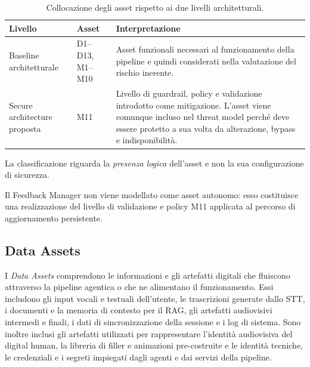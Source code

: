 \documentclass[11pt,a4paper]{article}
\begin{document}
\begin{table}[H]
\centering
\caption{Collocazione degli asset rispetto ai due livelli architetturali.}
\label{tab:asset-baseline-secure}
\small
\begin{tabularx}{\textwidth}{|L{3.4cm}|Y|Y|}
\hline
\textbf{Livello} &
\textbf{Asset} &
\textbf{Interpretazione}
\\
\hline

Baseline architetturale &
D1--D13, M1--M10 &
Asset funzionali necessari al funzionamento della pipeline e quindi
considerati nella valutazione del rischio inerente.
\\
\hline

Secure architecture proposta &
M11 &
Livello di guardrail, policy e validazione introdotto come mitigazione.
L'asset viene comunque incluso nel threat model perché deve essere
protetto a sua volta da alterazione, bypass e indisponibilità.
\\
\hline
\end{tabularx}
\end{table}

La classificazione riguarda la \emph{presenza logica} dell'asset e non
la sua configurazione di sicurezza. 

Il Feedback Manager non viene modellato come asset autonomo: esso
costituisce una realizzazione del livello di validazione e policy M11
applicata al percorso di aggiornamento persistente.

\subsection{Data Assets}
\label{subsec:data-assets}

I \textit{Data Assets} comprendono le informazioni e gli artefatti digitali che fluiscono attraverso la pipeline agentica o che ne alimentano il funzionamento. Essi includono gli input vocali e testuali dell'utente, le trascrizioni generate dallo STT, i documenti e la memoria di contesto per il RAG, gli artefatti audiovisivi intermedi e finali, i dati di sincronizzazione della sessione e i log di sistema.
Sono inoltre inclusi gli artefatti utilizzati per rappresentare l'identità audiovisiva del digital human, la libreria di filler e animazioni pre-costruite e le identità tecniche, le credenziali e i segreti impiegati dagli agenti e dai servizi della pipeline.
\end{document}
